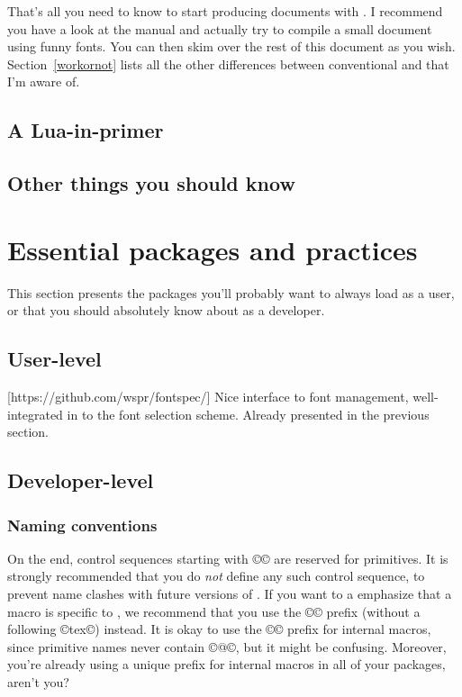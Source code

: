 \documentclass{lltxdoc}
\begin{document}
That's all you need to know to start producing documents with \lualatex. I
recommend you have a look at the  manual and actually try to
compile a small document using funny fonts. You can then skim over the rest of
this document as you wish. Section~\ref{workornot} lists all the other
differences between conventional \latex and \lualatex that I'm aware of.

\subsection{A Lua-in-\tex primer}\label{luaintex}

\subsection{Other things you should know}\label{things}


\section{Essential packages and practices}\label{essential}

This section presents the packages you'll probably want to always load as a
user, or that you should absolutely know about as a developer.

\subsection{User-level}

[https://github.com/wspr/fontspec/]
Nice interface to font management, well-integrated in to the \latex font
selection scheme. Already presented in the previous section.

\subsection{Developer-level}

\subsubsection{Naming conventions}

On the \tex end, control sequences starting with ©\luatex© are reserved for
primitives. It is strongly recommended that you do \emph{not} define any such
control sequence, to prevent name clashes with future versions of \luatex. If
you want to a emphasize that a macro is specific to \luatex, we recommend that
you use the ©\lua© prefix (without a following ©tex©) instead. It is okay to
use the ©\luatex@© prefix for internal macros, since primitive names never
contain ©@©, but it might be confusing. Moreover, you're already using a
unique prefix for internal macros in all of your packages, aren't you?
\end{document}
